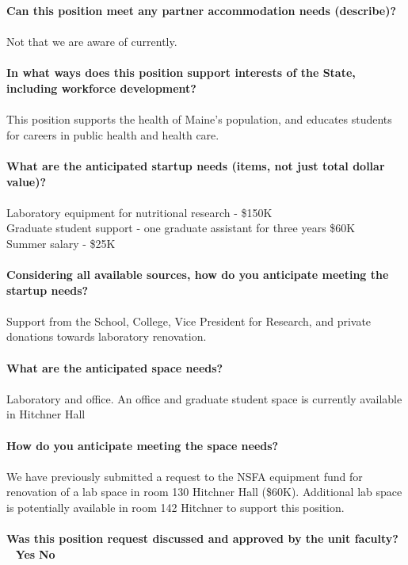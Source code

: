 \documentclass[11pt]{article}
\begin{document}
\vfill
\noindent\textbf{\rmfamily Can this position meet any partner accommodation needs (describe)?}
\\~\\Not that we are aware of currently.\\~\\
\vfill
\noindent\textbf{\rmfamily In what ways does this position support interests of the State, including workforce development?}\\~\\
This position supports the health of Maine's population, and educates students for careers in public health and health care.
\\~\\
\vfill
\newpage\noindent\textbf{\rmfamily What are the anticipated startup needs (items, not just total dollar value)?}\\~\\
Laboratory equipment for nutritional research - \$150K \\
Graduate student support - one graduate assistant for three years \$60K\\
Summer salary - \$25K\\~\\
\vfill
\noindent\textbf{\rmfamily Considering all available sources, how do you anticipate meeting the startup needs?}\\~\\
Support from the School, College, Vice President for Research, and private donations towards laboratory renovation.\\~\\
\vfill
\noindent\textbf{\rmfamily What are the anticipated space needs?}\\~\\ Laboratory and office. An office and graduate student space is currently available in Hitchner Hall\\~\\
\vfill
\noindent\textbf{\rmfamily How do you anticipate meeting the space needs?} \\~\\
We have previously submitted a request to the NSFA equipment fund for renovation of a lab space in room 130 Hitchner Hall (\$60K). Additional lab space is potentially available in room 142 Hitchner to support this position.\\~\\
\vfill
\noindent\textbf{\rmfamily Was this position request discussed and approved by the unit faculty?} \hfill ~ \hfill \textbf{\Large{\CrossedBox} \normalsize{Yes}} \hfill \textbf{\Large{\HollowBox} \normalsize{ No}}\\~\\%
\end{document}
